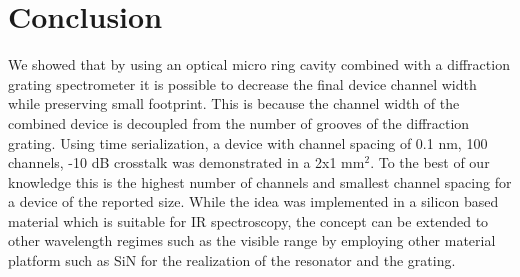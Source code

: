 \documentclass[12pt,twoside,english]{book}
\renewcommand{\~}{\perispomeni}%
\numberwithin{equation}{section}
\numberwithin{figure}{section}
\begin{document}
\section{Conclusion}
We showed that by using an optical micro ring cavity combined with a diffraction grating spectrometer it is possible to decrease the final device channel width while preserving small footprint. This is because the channel width of the combined device is decoupled from the number of grooves of the diffraction grating. Using time serialization, a device with channel spacing of 0.1 nm, 100 channels, -10 dB crosstalk was demonstrated in a 2x1 mm$^2$. To the best of our knowledge this is the highest number of channels and smallest channel spacing for a device of the reported size. While the idea was implemented in a silicon based material which is suitable for IR spectroscopy, the concept can be extended to other wavelength regimes such as the visible range by employing other material platform such as SiN for the realization of the resonator and the grating.


\end{document}
